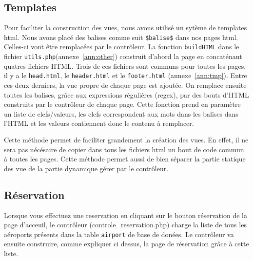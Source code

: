 \documentclass[12pt,a4paper]{article}
\begin{document}
		\subsection*{Templates}
		Pour faciliter la construction des vues, nous avons utilisé un sytème de templates html. Nous avons placé des balises comme suit \texttt{\$balise\$} dans nos pages html. Celles-ci vont être remplacées par le contrôleur. La fonction \texttt{buildHTML} dans le fichier \texttt{utils.php}(annexe~\ref{ann:other}) construit d'abord la page en concaténant quatres fichiers HTML. Trois de ces fichiers sont communs pour toutes les pages, il y a le \texttt{head.html}, le \texttt{header.html} et le \texttt{footer.html} (annexe~\ref{ann:tmp}).  Entre ces deux derniers, la vue propre de chaque page est ajoutée.
		On remplace ensuite toutes les balises, grâce aux expressions régulières (regex), par des bouts d'HTML construits par le contrôleur de chaque page. Cette fonction prend en paramètre un liste de clefs/valeurs, les clefs correspondent aux mots dans les balises dans l'HTML et les valeurs contiennent donc le contenu à remplacer.

		Cette méthode permet de faciliter grandement la création des vues. En effet, il ne sera pas nécésaire de copier dans tous les fichiers html un bout de code commun à toutes les pages. Cette méthode permet aussi de bien séparer la partie statique des vue de la partie dynamique gérer par le contrôleur.

		\subsection{Réservation}
      Lorsque vous effectuez une reservation en cliquant sur le bouton réservation de la page d'acceuil, le contrôleur (controle\_reservation.php) charge la liste de tous les aéroports présents dans la table \texttt{airport} de base de donées. Le contrôleur va ensuite construire, comme expliquer ci dessus, la page de réservation grâce à cette liste.
\end{document}
